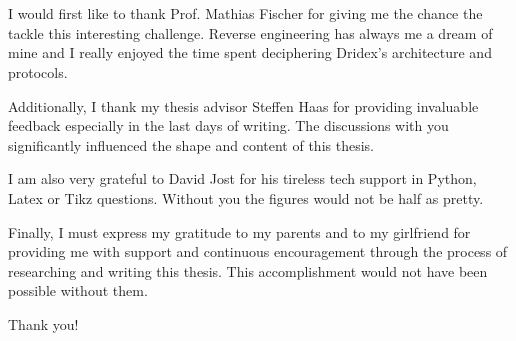 \chapter*{}

\thispagestyle{empty}

\begin{center}
I would first like to thank Prof. Mathias Fischer for giving me the chance the tackle this interesting challenge. Reverse engineering has always me a dream of mine and I really enjoyed the time spent deciphering Dridex's architecture and protocols.

\bigskip
\bigskip

Additionally, I thank my thesis advisor Steffen Haas for providing invaluable feedback especially in the last days of writing. The discussions with you significantly influenced the shape and content of this thesis.

\bigskip

I am also very grateful to David Jost for his tireless tech support in Python, Latex or Tikz questions. Without you the figures would not be half as pretty.

\bigskip
\bigskip

Finally, I must express my gratitude to my parents and to my girlfriend for providing me with support and continuous encouragement through the process of researching and writing this thesis. This accomplishment would not have been possible without them.
\smallskip

Thank you!
\end{center}

